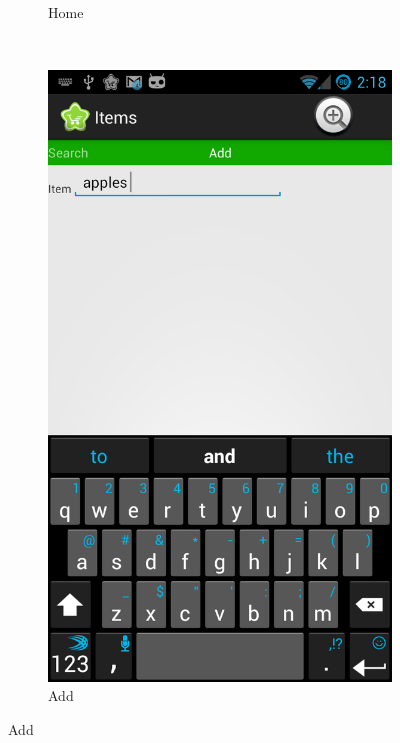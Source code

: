 \documentclass[journal]{IEEEtran}
\begin{document}
\begin{figure}[h!]
\begin{subfigure}[b]{0.1\textwidth}
        \caption{Home}
        \label{fig:home}
    \end{subfigure}%
    ~ %
    \begin{subfigure}[b]{0.1\textwidth}
        \centering
        \includegraphics[width=\textwidth]{images/s2.png}
        \caption{Add}
        \label{fig:add}
    \end{subfigure}

\end{figure}
\end{document}
